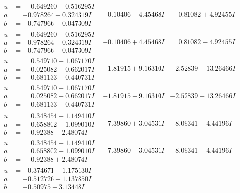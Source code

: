 \documentclass[1p]{elsarticle_modified}
\theoremstyle{definition}
\begin{document}
$$\begin{array}{c|c|c}
\begin{aligned}
u &= \phantom{-}0.649260 + 0.516295 I \\
a &= -0.978264 + 0.324319 I \\
b &= -0.747966 + 0.047309 I\end{aligned}
 & -0.10406 - 4.45468 I & \phantom{-}0.81082 + 4.92455 I \\ \hline\begin{aligned}
u &= \phantom{-}0.649260 - 0.516295 I \\
a &= -0.978264 - 0.324319 I \\
b &= -0.747966 - 0.047309 I\end{aligned}
 & -0.10406 + 4.45468 I & \phantom{-}0.81082 - 4.92455 I \\ \hline\begin{aligned}
u &= \phantom{-}0.549710 + 1.067170 I \\
a &= \phantom{-}0.025082 - 0.662017 I \\
b &= \phantom{-}0.681133 - 0.440731 I\end{aligned}
 & -1.81915 + 9.16310 I & -2.52839 - 13.26466 I \\ \hline\begin{aligned}
u &= \phantom{-}0.549710 - 1.067170 I \\
a &= \phantom{-}0.025082 + 0.662017 I \\
b &= \phantom{-}0.681133 + 0.440731 I\end{aligned}
 & -1.81915 - 9.16310 I & -2.52839 + 13.26466 I \\ \hline\begin{aligned}
u &= \phantom{-}0.348454 + 1.149410 I \\
a &= \phantom{-}0.658802 - 1.099010 I \\
b &= \phantom{-}0.92388 - 2.48074 I\end{aligned}
 & -7.39860 + 3.04531 I & -8.09341 - 4.44196 I \\ \hline\begin{aligned}
u &= \phantom{-}0.348454 - 1.149410 I \\
a &= \phantom{-}0.658802 + 1.099010 I \\
b &= \phantom{-}0.92388 + 2.48074 I\end{aligned}
 & -7.39860 - 3.04531 I & -8.09341 + 4.44196 I \\ \hline\begin{aligned}
u &= -0.374671 + 1.175130 I \\
a &= -0.512726 - 1.137850 I \\
b &= -0.50975 - 3.13448 I\end{aligned}

\end{array}$$
\end{document}
